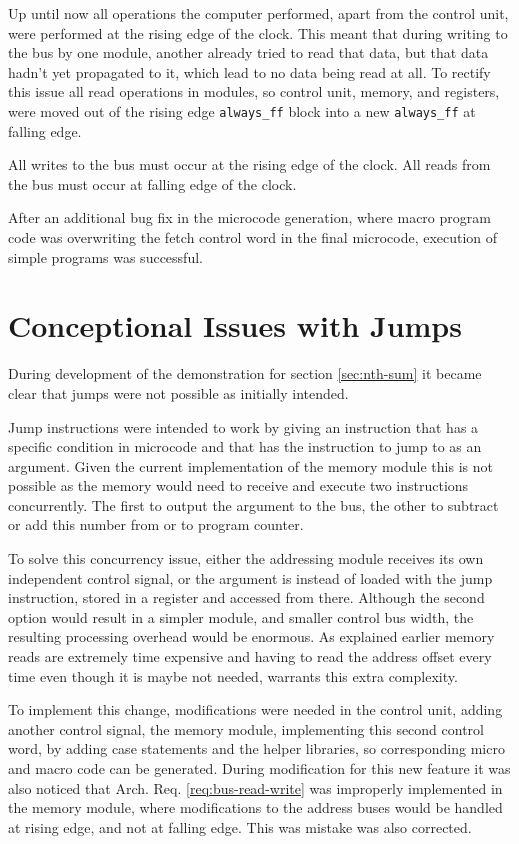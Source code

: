 Up until now all operations the computer performed, apart from the control unit, were performed at the rising edge of the clock. This meant that during writing to the bus by one module, another already tried to read that data, but that data hadn't yet propagated to it, which lead to no data being read at all. To rectify this issue all read operations in modules, so control unit, memory, and registers, were moved out of the rising edge \texttt{always\_ff} block into a new \texttt{always\_ff} at falling edge.

\begin{arch-requirement} \label{req:bus-read-write}
  All writes to the bus must occur at the rising edge of the clock. All reads from the bus must occur at falling edge of the clock.
\end{arch-requirement}

After an additional bug fix in the microcode generation, where macro program code was overwriting the fetch control word in the final microcode, execution of simple programs was successful.


\section{Conceptional Issues with Jumps}
During development of the demonstration for section \ref{sec:nth-sum} it became clear that jumps were not possible as initially intended. 

Jump instructions were intended to work by giving an instruction that has a specific condition in microcode and that has the instruction to jump to as an argument. Given the current implementation of the memory module this is not possible as the memory would need to receive and execute two instructions concurrently. The first to output the argument to the bus, the other to subtract or add this number from or to program counter. 

To solve this concurrency issue, either the addressing module receives its own independent control signal, or the argument is instead of loaded with the jump instruction, stored in a register and accessed from there. 
\pagebreak
Although the second option would result in a simpler module, and smaller control bus width, the resulting processing overhead would be enormous. As explained earlier memory reads are extremely time expensive and having to read the address offset every time even though it is maybe not needed, warrants this extra complexity.

To implement this change, modifications were needed in the control unit, adding another control signal, the memory module, implementing this second control word, by adding case statements and the helper libraries, so corresponding micro and macro code can be generated. During modification for this new feature it was also noticed that Arch. Req. \ref{req:bus-read-write} was improperly implemented in the memory module, where modifications to the address buses would be handled at rising edge, and not at falling edge. This was mistake was also corrected.

